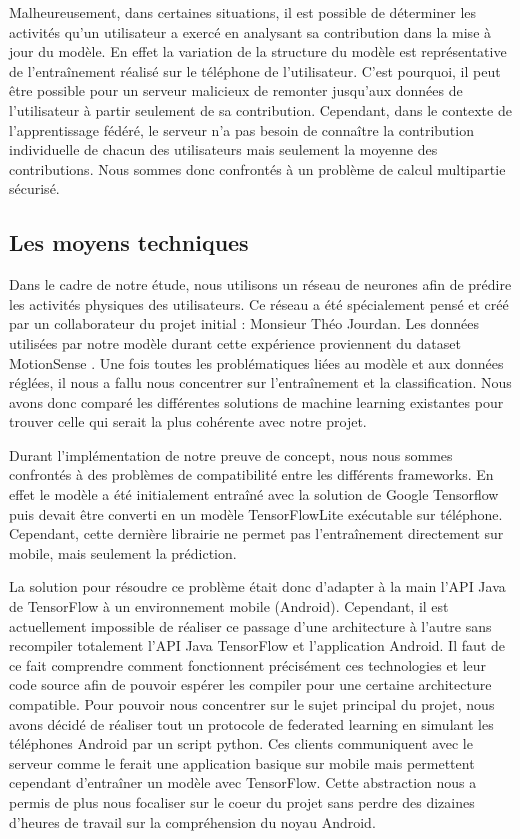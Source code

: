 \documentclass{article}
\begin{document}
Malheureusement, dans certaines situations, il est possible de déterminer les activités qu'un utilisateur a exercé en analysant sa contribution dans la mise à jour du modèle. En effet la variation de la structure du modèle est représentative de l'entraînement réalisé sur le téléphone de l'utilisateur. C’est pourquoi, il peut être possible pour un serveur malicieux de remonter jusqu’aux données de l’utilisateur à partir seulement de sa contribution. Cependant, dans le contexte de l'apprentissage fédéré, le serveur n'a pas besoin de connaître la contribution individuelle de chacun des utilisateurs mais seulement la moyenne des contributions. Nous sommes donc confrontés à un problème de calcul multipartie sécurisé.
 
\subsection{Les moyens techniques}

Dans le cadre de notre étude, nous utilisons un réseau de neurones afin de prédire les activités physiques des utilisateurs. Ce réseau a été spécialement pensé et créé par un collaborateur du projet initial : Monsieur Théo Jourdan. Les données utilisées par notre modèle durant cette expérience proviennent du dataset MotionSense \cite{MalekzadehMobileSensorData2019} \cite{MalekzadehPrivacyUtilityPreserving2019}.
Une fois toutes les problématiques liées au modèle et aux données réglées, il nous a fallu nous concentrer sur l'entraînement et la classification. Nous avons donc comparé les différentes solutions de machine learning existantes pour trouver celle qui serait la plus cohérente avec notre projet.

Durant l'implémentation de notre preuve de concept, nous nous sommes confrontés à des problèmes de compatibilité entre les différents frameworks. En effet le modèle a été initialement entraîné  avec la solution de Google Tensorflow puis devait être converti en un modèle TensorFlowLite exécutable sur téléphone. Cependant, cette dernière librairie ne permet pas l'entraînement directement sur mobile, mais seulement la prédiction.

La solution pour résoudre ce problème était donc d'adapter à la main l'API Java de TensorFlow à un environnement mobile (Android). Cependant, il est actuellement impossible de réaliser ce passage d'une architecture à l'autre sans recompiler totalement l'API Java TensorFlow et l'application Android. Il faut de ce fait comprendre comment fonctionnent précisément ces technologies et leur code source afin de pouvoir espérer les compiler pour une certaine architecture compatible.
Pour pouvoir nous concentrer sur le sujet principal du projet, nous avons décidé de réaliser tout un protocole de federated learning en simulant les téléphones Android par un script python. Ces clients communiquent avec le serveur comme le ferait une application basique sur mobile mais permettent cependant d'entraîner un modèle avec TensorFlow.
Cette abstraction nous a permis de plus nous focaliser sur le coeur du projet sans perdre des dizaines d'heures de travail sur la compréhension du noyau Android.
\end{document}
